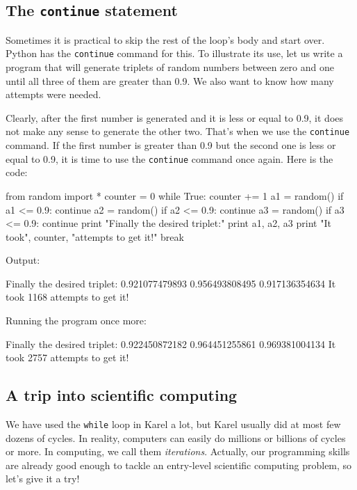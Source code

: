 \subsection{The {\tt continue} statement}

Sometimes it is practical to skip the rest of the loop's body and start over. Python 
has the {\tt continue} command for this. To illustrate its use, let us write 
a program that will generate triplets of random numbers between zero and one
until all three of them are greater than 0.9. We also want to know how many 
attempts were needed. 

Clearly, after the first number is generated and it is less or equal to 0.9,
it does not make any sense to generate the other two. That's when 
we use the {\tt continue} command. If the first number is greater than 0.9 
but the second one is less or equal to 0.9, it is time to use the {\tt continue} 
command once again. Here is the code:

\begin{bluecode}
from random import *
counter = 0
while True:
    counter += 1
    a1 = random()
    if a1 <= 0.9:
        continue
    a2 = random()
    if a2 <= 0.9:
        continue
    a3 = random()
    if a3 <= 0.9:
        continue
    print "Finally the desired triplet:" 
    print a1, a2, a3
    print "It took", counter, "attempts to get it!"
    break
\end{bluecode}
Output:

\begin{greencode}
Finally the desired triplet:
0.921077479893 0.956493808495 0.917136354634
It took 1168 attempts to get it!
\end{greencode}
Running the program once more:

\begin{greencode}
Finally the desired triplet:
0.922450872182 0.964451255861 0.969381004134
It took 2757 attempts to get it!
\end{greencode}

\subsection{A trip into scientific computing}

We have used the {\tt while} loop in Karel a lot,
but Karel usually did at most few dozens of cycles. In reality, computers can easily 
do millions or billions of cycles or more. In computing, we call them {\em iterations}.
Actually, our programming skills are already good enough to tackle an entry-level
scientific computing problem, so let's give it a try! 

